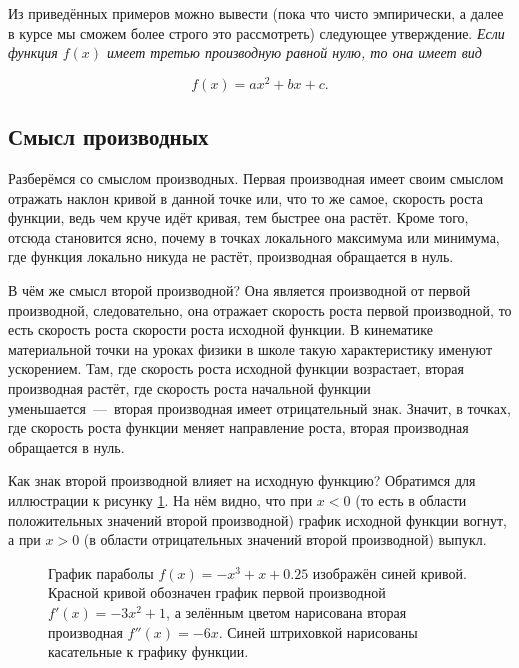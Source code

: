 \documentclass[12pt]{article}
\begin{document}
Из приведённых примеров можно вывести (пока что чисто эмпирически, а далее в курсе мы сможем более строго это рассмотреть) следующее утверждение. \emph{Если функция $f(x)$ имеет третью производную равной нулю, то она имеет вид} 

\begin{equation}
	f(x)=ax^2+bx+c.
\end{equation}

\subsection{Смысл производных}
Разберёмся со смыслом производных. Первая производная имеет своим смыслом отражать наклон кривой в данной точке или, что то же самое, скорость роста функции, ведь чем круче идёт кривая, тем быстрее она растёт. Кроме того, отсюда становится ясно, почему в точках локального максимума или минимума, где функция локально никуда не растёт, производная обращается в нуль. 

\par В чём же смысл второй производной? Она является производной от первой производной, следовательно, она отражает скорость роста первой производной, то есть скорость роста скорости роста исходной функции. В кинематике материальной точки на уроках физики в школе такую характеристику именуют ускорением. Там, где скорость роста исходной функции возрастает, вторая производная растёт, где скорость роста начальной функции уменьшается~\----~вторая производная имеет отрицательный знак. Значит, в точках, где скорость роста функции меняет направление роста, вторая производная обращается в нуль.

\par Как знак второй производной влияет на исходную функцию? Обратимся для иллюстрации к рисунку \ref{fig:71}. На нём видно, что при $x<0$ (то есть в области положительных значений второй производной) график исходной функции вогнут, а при $x>0$ (в области отрицательных значений второй производной) выпукл.

\begin{figure}[htbp]
\centering
{}
\caption{График параболы $f(x) = -x^3 + x + 0.25$ изображён синей кривой. Красной кривой обозначен график первой производной $f'(x) = -3x^2+1$, а зелённым цветом нарисована вторая производная $f''(x) = -6x$. Синей штриховкой нарисованы касательные к графику функции.}
\label{fig:71}
\end{figure}
\end{document}
